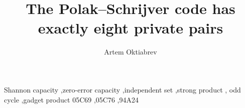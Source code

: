 \usepackage{cmap}
\usepackage[T1]{fontenc}
\usepackage{lmodern}
\usepackage{amsmath,amssymb,amsthm}
\usepackage{booktabs}
\usepackage[hidelinks]{hyperref}

\newtheorem{theorem}{Theorem}
\newtheorem{lemma}[theorem]{Lemma}
\newtheorem{proposition}[theorem]{Proposition}
\newtheorem{corollary}[theorem]{Corollary}
\theoremstyle{definition}
\newtheorem{definition}[theorem]{Definition}
\theoremstyle{remark}
\newtheorem{observation}[theorem]{Observation}
\newtheorem{remark}[theorem]{Remark}

\newcommand{\PH}{P^{\mathrm H}}
\newcommand{\PV}{P^{\mathrm V}}
\newcommand{\Zs}{\mathbb{Z}_7^5}
\newcommand{\boxt}{\boxtimes}




\begin{frontmatter}

\title{The Polak--Schrijver code has exactly eight private pairs}

\author{Artem Oktiabrev}

\begin{abstract}

\end{abstract}

\begin{keyword}
Shannon capacity \sep zero-error capacity \sep independent set \sep strong product \sep
odd cycle \sep gadget product
\MSC[2020] 05C69 \sep 05C76 \sep 94A24
\end{keyword}

\end{frontmatter}







